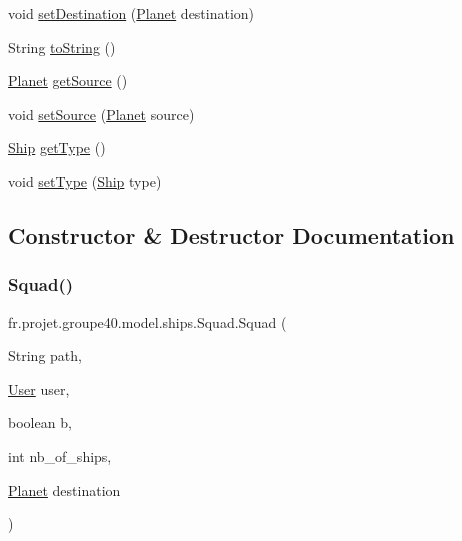 \begin{DoxyCompactItemize}
\item 
void \hyperlink{classfr_1_1projet_1_1groupe40_1_1model_1_1ships_1_1_squad_a04e7c22fbd42071df3c61a502f268175}{set\+Destination} (\hyperlink{classfr_1_1projet_1_1groupe40_1_1model_1_1board_1_1_planet}{Planet} destination)
\item 
String \hyperlink{classfr_1_1projet_1_1groupe40_1_1model_1_1ships_1_1_squad_a64a7b3b5df69be42303e16111d0adcdc}{to\+String} ()
\item 
\hyperlink{classfr_1_1projet_1_1groupe40_1_1model_1_1board_1_1_planet}{Planet} \hyperlink{classfr_1_1projet_1_1groupe40_1_1model_1_1ships_1_1_squad_a16980138bd442c9251eb1ede83b1b38f}{get\+Source} ()
\item 
void \hyperlink{classfr_1_1projet_1_1groupe40_1_1model_1_1ships_1_1_squad_aa670ae5e499a268d8379c3745c0d6ab7}{set\+Source} (\hyperlink{classfr_1_1projet_1_1groupe40_1_1model_1_1board_1_1_planet}{Planet} source)
\item 
\hyperlink{classfr_1_1projet_1_1groupe40_1_1model_1_1ships_1_1_ship}{Ship} \hyperlink{classfr_1_1projet_1_1groupe40_1_1model_1_1ships_1_1_squad_afb409e6b72c20f3050ebd9824237e68b}{get\+Type} ()
\item 
void \hyperlink{classfr_1_1projet_1_1groupe40_1_1model_1_1ships_1_1_squad_add7441bccd26d43a2fcea725a5d35e3a}{set\+Type} (\hyperlink{classfr_1_1projet_1_1groupe40_1_1model_1_1ships_1_1_ship}{Ship} type)
\end{DoxyCompactItemize}


\subsection{Constructor \& Destructor Documentation}
\mbox{\label{classfr_1_1projet_1_1groupe40_1_1model_1_1ships_1_1_squad_a5006326c653ad0f70f3092e7668d2c8d}} 
\subsubsection{\texorpdfstring{Squad()}{Squad()}\hspace{0.1cm}{\footnotesize\ttfamily [1/2]}}
{\footnotesize\ttfamily fr.\+projet.\+groupe40.\+model.\+ships.\+Squad.\+Squad (\begin{DoxyParamCaption}\item[{String}]{path,  }\item[{\hyperlink{classfr_1_1projet_1_1groupe40_1_1client_1_1_user}{User}}]{user,  }\item[{boolean}]{b,  }\item[{int}]{nb\+\_\+of\+\_\+ships,  }\item[{\hyperlink{classfr_1_1projet_1_1groupe40_1_1model_1_1board_1_1_planet}{Planet}}]{destination }\end{DoxyParamCaption})}

